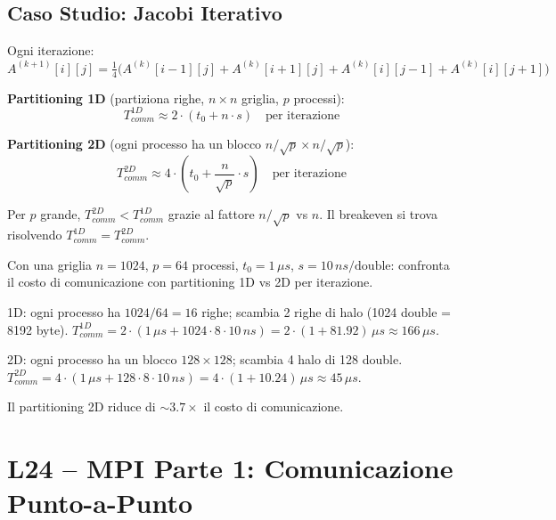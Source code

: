 \documentclass[11pt,a4paper]{article}
\theoremstyle{remark}
\newenvironment{esercizio}[1][]{%
  \begin{tcolorbox}[breakable,title={\textbf{Esercizio / Domanda d'esame}\ifx&#1&\else: #1\fi},
    colback=yellow!5!white, colframe=orange!75!black, fonttitle=\small\bfseries]%
}{%
  \end{tcolorbox}%
}
\newenvironment{risposta}{%
  \begin{tcolorbox}[breakable,title={\textbf{Risposta}},
    colback=green!5!white, colframe=green!50!black, fonttitle=\small\bfseries]%
}{%
  \end{tcolorbox}%
}
\begin{document}
\subsection{Caso Studio: Jacobi Iterativo}

Ogni iterazione: $A^{(k+1)}[i][j] = \frac{1}{4}\bigl(A^{(k)}[i-1][j] + A^{(k)}[i+1][j] + A^{(k)}[i][j-1] + A^{(k)}[i][j+1]\bigr)$

\textbf{Partitioning 1D} (partiziona righe, $n \times n$ griglia, $p$ processi):
\begin{equation}
T_{comm}^{1D} \approx 2 \cdot (t_0 + n \cdot s) \quad \text{per iterazione}
\end{equation}

\textbf{Partitioning 2D} (ogni processo ha un blocco $n/\sqrt{p} \times n/\sqrt{p}$):
\begin{equation}
T_{comm}^{2D} \approx 4 \cdot \left(t_0 + \frac{n}{\sqrt{p}} \cdot s\right) \quad \text{per iterazione}
\end{equation}

Per $p$ grande, $T_{comm}^{2D} < T_{comm}^{1D}$ grazie al fattore $n/\sqrt{p}$ vs $n$. Il breakeven si trova risolvendo $T_{comm}^{1D} = T_{comm}^{2D}$.

\begin{esercizio}
Con una griglia $n=1024$, $p=64$ processi, $t_0 = 1\,\mu s$, $s = 10\,ns/\text{double}$: confronta il costo di comunicazione con partitioning 1D vs 2D per iterazione.
\end{esercizio}
\begin{risposta}
1D: ogni processo ha $1024/64 = 16$ righe; scambia 2 righe di halo (1024 double = 8192 byte).
$T_{comm}^{1D} = 2 \cdot (1\,\mu s + 1024 \cdot 8 \cdot 10\,ns) = 2 \cdot (1 + 81.92)\,\mu s \approx 166\,\mu s$.

2D: ogni processo ha un blocco $128 \times 128$; scambia 4 halo di 128 double.
$T_{comm}^{2D} = 4 \cdot (1\,\mu s + 128 \cdot 8 \cdot 10\,ns) = 4 \cdot (1 + 10.24)\,\mu s \approx 45\,\mu s$.

Il partitioning 2D riduce di $\sim 3.7\times$ il costo di comunicazione.
\end{risposta}

\section{L24 -- MPI Parte 1: Comunicazione Punto-a-Punto}
\end{document}

